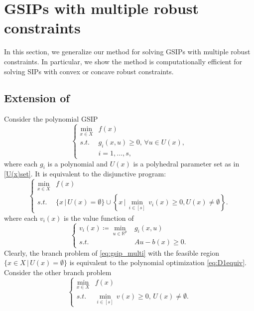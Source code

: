 \documentclass{amsart}
\theoremstyle{plain}
\newcommand{\re}{\mathbb{R}}
\newcommand{\st}{\mathit{s.t.}}
\numberwithin{equation}{section}
\begin{document}
		
		
		
		
		
		
		
		
		
		\section{GSIPs with multiple robust constraints}
		\label{sc:convconca}
		In this section, we generalize our method for solving GSIPs
		with multiple robust constraints. 
		In particular, we show the method is computationally efficient for solving
		SIPs with convex or concave robust constraints. 
		
		
		
		\subsection{Extension of }
		Consider the polynomial GSIP
		\begin{equation}\label{eq:gsip_multi}
			\left\{\begin{array}{cl}
				\min\limits_{x\in X} & f(x)\\
				\st & g_i(x,u)\ge 0,\,\forall u\in U(x),\\
				& i=1,\ldots, s,
			\end{array}
			\right.
		\end{equation}
		where each $g_i$ is a polynomial and $U(x)$ is a polyhedral parameter set 
		as in \eqref{U(x)set}. 
		It is equivalent to the disjunctive program:
		\[
		\left\{\begin{array}{cl}
			\min\limits_{x\in X} & f(x)\\
			\st & \{x\,\vert\,U(x) = \emptyset \}\cup 
			\left\{x\,\Big\vert\,\min\limits_{i\in[s]}\, v_i(x)\ge 0, U(x)\neq \emptyset\right\}.
		\end{array}
		\right.
		\]
		where each $v_i(x)$ is the value function of
		\begin{equation}\label{eq:vi}
			\left\{\begin{array}{rl}
				v_i(x)\coloneqq \min\limits_{u\in\re^p} &  g_i(x,u)\\
				\st & Au-b(x)\ge 0.
			\end{array}
			\right.
		\end{equation}
		Clearly, the branch problem of \eqref{eq:gsip_multi} with the feasible region $\{x\in X\,\vert\, U(x)=\emptyset\}$
		is equivalent to the polynomial optimization \eqref{eq:D1equiv}.
		Consider the other branch problem 
		\begin{equation}\label{eq:vi_branch}
		\left\{\begin{array}{cl}
			\min\limits_{x\in X} & f(x)\\
		\st & \min\limits_{i\in[s]}\, v(x)\ge 0,\, U(x)\not=\emptyset.
		\end{array}\right.
		\end{equation}
\end{document}
